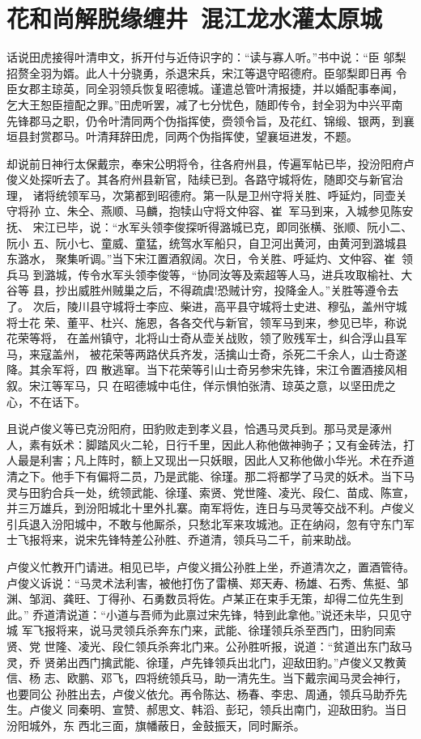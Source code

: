 \chapter{花和尚解脱缘缠井~混江龙水灌太原城}

话说田虎接得叶清申文，拆开付与近侍识字的：“读与寡人听。”书中说：“臣
邬梨招赘全羽为婿。此人十分骁勇，杀退宋兵，宋江等退守昭德府。臣邬梨即日再
令臣女郡主琼英，同全羽领兵恢复昭德城。谨遣总管叶清报捷，并以婚配事奉闻，
乞大王恕臣擅配之罪。”田虎听罢，减了七分忧色，随即传令，封全羽为中兴平南
先锋郡马之职，仍令叶清同两个伪指挥使，赍领令旨，及花红、锦缎、银两，到襄
垣县封赏郡马。叶清拜辞田虎，同两个伪指挥使，望襄垣进发，不题。

却说前日神行太保戴宗，奉宋公明将令，往各府州县，传遍军帖已毕，投汾阳府卢
俊义处探听去了。其各府州县新官，陆续已到。各路守城将佐，随即交与新官治理，
诸将统领军马，次第都到昭德府。第一队是卫州守将关胜、呼延灼，同壶关守将孙
立、朱仝、燕顺、马麟，抱犊山守将文仲容、崔，军马到来，入城参见陈安抚、
宋江已毕，说：“水军头领李俊探听得潞城已克，即同张横、张顺、阮小二、阮小
五、阮小七、童威、童猛，统驾水军船只，自卫河出黄河，由黄河到潞城县东潞水，
聚集听调。”当下宋江置酒叙阔。次日，令关胜、呼延灼、文仲容、崔，领兵马
到潞城，传令水军头领李俊等，“协同汝等及索超等人马，进兵攻取榆社、大谷等
县，抄出威胜州贼巢之后，不得疏虞!恐贼计穷，投降金人。”关胜等遵令去了。
次后，陵川县守城将士李应、柴进，高平县守城将士史进、穆弘，盖州守城将士花
荣、董平、杜兴、施恩，各各交代与新官，领军马到来，参见已毕，称说花荣等将，
在盖州镇守，北将山士奇从壶关战败，领了败残军士，纠合浮山县军马，来寇盖州，
被花荣等两路伏兵齐发，活擒山士奇，杀死二千余人，山士奇遂降。其余军将，四
散逃窜。当下花荣等引山士奇另参宋先锋，宋江令置酒接风相叙。宋江等军马，只
在昭德城中屯住，佯示惧怕张清、琼英之意，以坚田虎之心，不在话下。

且说卢俊义等已克汾阳府，田豹败走到孝义县，恰遇马灵兵到。那马灵是涿州
人，素有妖术：脚踏风火二轮，日行千里，因此人称他做神驹子；又有金砖法，打
人最是利害；凡上阵时，额上又现出一只妖眼，因此人又称他做小华光。术在乔道
清之下。他手下有偏将二员，乃是武能、徐瑾。那二将都学了马灵的妖术。当下马
灵与田豹合兵一处，统领武能、徐瑾、索贤、党世隆、凌光、段仁、苗成、陈宣，
并三万雄兵，到汾阳城北十里外扎寨。南军将佐，连日与马灵等交战不利。卢俊义
引兵退入汾阳城中，不敢与他厮杀，只愁北军来攻城池。正在纳闷，忽有守东门军
士飞报将来，说宋先锋特差公孙胜、乔道清，领兵马二千，前来助战。

卢俊义忙教开门请进。相见已毕，卢俊义揖公孙胜上坐，乔道清次之，置酒管待。
卢俊义诉说：“马灵术法利害，被他打伤了雷横、郑天寿、杨雄、石秀、焦挺、邹
渊、邹润、龚旺、丁得孙、石勇数员将佐。卢某正在束手无策，却得二位先生到此。”
乔道清说道：“小道与吾师为此禀过宋先锋，特到此拿他。”说还未毕，只见守城
军飞报将来，说马灵领兵杀奔东门来，武能、徐瑾领兵杀至西门，田豹同索贤、党
世隆、凌光、段仁领兵杀奔北门来。公孙胜听报，说道：“贫道出东门敌马灵，乔
贤弟出西门擒武能、徐瑾，卢先锋领兵出北门，迎敌田豹。”卢俊义又教黄信、杨
志、欧鹏、邓飞，四将统领兵马，助一清先生。当下戴宗闻马灵会神行，也要同公
孙胜出去，卢俊义依允。再令陈达、杨春、李忠、周通，领兵马助乔先生。卢俊义
同秦明、宣赞、郝思文、韩滔、彭玘，领兵出南门，迎敌田豹。当日汾阳城外，东
西北三面，旗幡蔽日，金鼓振天，同时厮杀。

